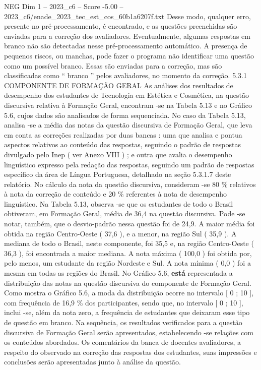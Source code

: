 \begin{textsample}{NEG Dim 1 – 2023\_c6 – Score -5.00 – 2023\_c6/enade\_2023\_tec\_est\_cos\_60b1a6207f.txt}
Desse modo, qualquer erro, presente no pré-processamento, é encontrado, e as questões preenchidas são enviadas para a correção dos avaliadores.
Eventualmente, algumas respostas em branco não são detectadas nesse pré-processamento automático.
A presença de pequenos riscos, ou manchas, pode fazer o programa não identificar uma questão como um possível branco.
Essas são enviadas para a correção, mas são classificadas como “ branco ” pelos avaliadores, no momento da correção. 5.3.1 COMPONENTE DE FORMAÇÃO GERAL As análises dos resultados de desempenho dos estudantes de Tecnologia em Estética e Cosmética, na questão discursiva relativa à Formação Geral, encontram -se na Tabela 5.13 e no Gráfico 5.6, cujos dados são analisados de forma sequenciada.
No caso da Tabela 5.13, analisa -se a média das notas da questão discursiva de Formação Geral, que leva em conta as correções realizadas por duas bancas : uma que analisa e pontua aspectos relativos ao conteúdo das respostas, seguindo o padrão de respostas divulgado pelo Inep ( ver Anexo VIII ) ; e outra que avalia o desempenho linguístico expresso pela redação das respostas, seguindo um padrão de respostas específico da área de Língua Portuguesa, detalhado na seção 5.3.1.7 deste relatório.
No cálculo da nota da questão discursiva, consideram -se 80 \% relativos à nota da correção de conteúdo e 20 \% referentes à nota de desempenho linguístico.
Na Tabela 5.13, observa -se que os estudantes de todo o Brasil obtiveram, em Formação Geral, média de 36,4 na questão discursiva.
Pode -se notar, também, que o desvio-padrão nessa questão foi de 24,9.
A maior média foi obtida na região Centro-Oeste ( 37,6 ), e a menor, na região Sul ( 35,9 ).
A mediana de todo o Brasil, neste componente, foi 35,5 e, na região Centro-Oeste ( 36,3 ), foi encontrada a maior mediana.
A nota máxima ( 100,0 ) foi obtida por, pelo menos, um estudante da região Nordeste e Sul.
A nota mínima ( 0,0 ) foi a mesma em todas as regiões do Brasil.
No Gráfico 5.6, \textbf{está} representada a distribuição das notas na questão discursiva do componente de Formação Geral.
Como mostra o Gráfico 5.6, a moda da distribuição ocorre no intervalo [ 0 ; 10 ], com frequência de 16,9 \% dos participantes, sendo que, no intervalo [ 0 ; 10 ], inclui -se, além da nota zero, a frequência de estudantes que deixaram esse tipo de questão em branco.
Na sequência, os resultados verificados para a questão discursiva de Formação Geral serão apresentados, estabelecendo -se relações com os conteúdos abordados.
Os comentários da banca de docentes avaliadores, a respeito do observado na correção das respostas dos estudantes, suas impressões e conclusões serão apresentadas junto à análise da questão.

\end{textsample}

